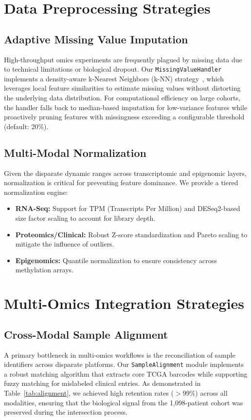 \documentclass[sigconf,nonacm]{acmart}
\begin{document}
\section{Data Preprocessing Strategies}

\subsection{Adaptive Missing Value Imputation}
High-throughput omics experiments are frequently plagued by missing data due to technical limitations or biological dropout. Our \texttt{MissingValueHandler} implements a density-aware k-Nearest Neighbors (k-NN) strategy~\cite{troyanskaya2001}, which leverages local feature similarities to estimate missing values without distorting the underlying data distribution. For computational efficiency on large cohorts, the handler falls back to median-based imputation for low-variance features while proactively pruning features with missingness exceeding a configurable threshold (default: 20\%).

\subsection{Multi-Modal Normalization}
Given the disparate dynamic ranges across transcriptomic and epigenomic layers, normalization is critical for preventing feature dominance. We provide a tiered normalization engine:
\begin{itemize}
    \item \textbf{RNA-Seq:} Support for TPM (Transcripts Per Million) and DESeq2-based size factor scaling to account for library depth.
    \item \textbf{Proteomics/Clinical:} Robust Z-score standardization and Pareto scaling to mitigate the influence of outliers.
    \item \textbf{Epigenomics:} Quantile normalization to ensure consistency across methylation arrays.
\end{itemize}

\section{Multi-Omics Integration Strategies}

\subsection{Cross-Modal Sample Alignment}
A primary bottleneck in multi-omics workflows is the reconciliation of sample identifiers across disparate platforms. Our \texttt{SampleAlignment} module implements a robust matching algorithm that extracts core TCGA barcodes while supporting fuzzy matching for mislabeled clinical entries. As demonstrated in Table~\ref{tab:alignment}, we achieved high retention rates ($>99\%$) across all modalities, ensuring that the biological signal from the 1,098-patient cohort was preserved during the intersection process.
\end{document}
